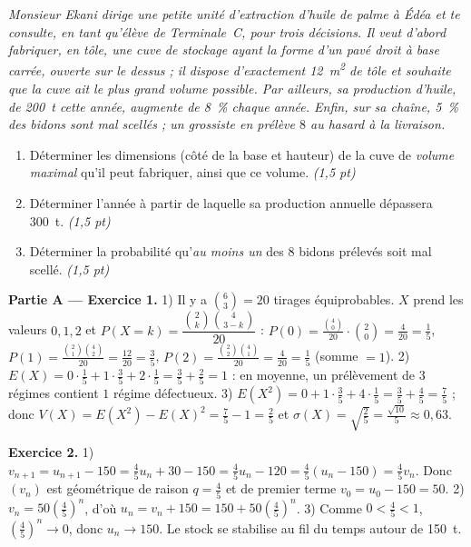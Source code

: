 \noindent\textit{Monsieur Ekani dirige une petite unité d'extraction d'huile de palme à
Édéa et te consulte, en tant qu'élève de Terminale~C, pour trois décisions. Il veut
d'abord fabriquer, en tôle, une cuve de stockage ayant la forme d'un pavé droit à
\emph{base carrée}, \emph{ouverte sur le dessus} ; il dispose d'exactement
\SI{12}{\metre\squared} de tôle et souhaite que la cuve ait le plus grand volume
possible. Par ailleurs, sa production d'huile, de \SI{200}{\tonne} cette année,
augmente de \SI{8}{\percent} chaque année. Enfin, sur sa chaîne, \SI{5}{\percent} des
bidons sont mal scellés ; un grossiste en prélève $8$ au hasard à la livraison.}

\begin{enumerate}[label=\textbf{Tâche \arabic*.},leftmargin=2.4em]
\item Déterminer les dimensions (côté de la base et hauteur) de la cuve de \emph{volume maximal}
qu'il peut fabriquer, ainsi que ce volume. \hfill\textit{(1,5 pt)}
\item Déterminer l'année à partir de laquelle sa production annuelle dépassera \SI{300}{\tonne}. \hfill\textit{(1,5 pt)}
\item Déterminer la probabilité qu'\emph{au moins un} des $8$ bidons prélevés soit mal scellé. \hfill\textit{(1,5 pt)}
\end{enumerate}
\par{}


\noindent\textbf{Partie A — Exercice 1.}
1) Il y a $\binom63=20$ tirages équiprobables. $X$ prend les valeurs $0,1,2$ et
$P(X{=}k)=\dfrac{\binom2k\binom4{3-k}}{20}$ :
$P(0)=\frac{\binom40}{20}\cdot\binom20=\frac{4}{20}=\frac15$,
$P(1)=\frac{\binom21\binom42}{20}=\frac{12}{20}=\frac35$,
$P(2)=\frac{\binom22\binom41}{20}=\frac{4}{20}=\frac15$ (somme $=1$).
2) $E(X)=0\cdot\frac15+1\cdot\frac35+2\cdot\frac15=\frac35+\frac25=1$ : en moyenne, un
prélèvement de $3$ régimes contient $1$ régime défectueux.
3) $E(X^2)=0+1\cdot\frac35+4\cdot\frac15=\frac35+\frac45=\frac75$ ; donc
$V(X)=E(X^2)-E(X)^2=\frac75-1=\frac25$ et $\sigma(X)=\sqrt{\frac25}=\frac{\sqrt{10}}{5}\approx0{,}63$.

\noindent\textbf{Exercice 2.}
1) $v_{n+1}=u_{n+1}-150=\frac45u_n+30-150=\frac45u_n-120=\frac45(u_n-150)=\frac45v_n$.
Donc $(v_n)$ est géométrique de raison $q=\frac45$ et de premier terme $v_0=u_0-150=50$.
2) $v_n=50\left(\frac45\right)^{\!n}$, d'où $u_n=v_n+150=150+50\left(\frac45\right)^{\!n}$.
3) Comme $0<\frac45<1$, $\left(\frac45\right)^{n}\to0$, donc $u_n\to150$. Le stock se
stabilise au fil du temps autour de \SI{150}{\tonne}.

